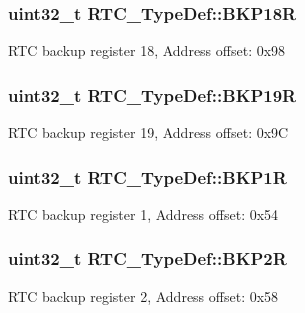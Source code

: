 \subsubsection[{\texorpdfstring{B\+K\+P18R}{BKP18R}}]{ uint32\+\_\+t R\+T\+C\+\_\+\+Type\+Def\+::\+B\+K\+P18R}\hypertarget{struct_r_t_c___type_def_a171288f82cab2623832de779fb435d74}{}\label{struct_r_t_c___type_def_a171288f82cab2623832de779fb435d74}
R\+TC backup register 18, Address offset\+: 0x98 
\subsubsection[{\texorpdfstring{B\+K\+P19R}{BKP19R}}]{ uint32\+\_\+t R\+T\+C\+\_\+\+Type\+Def\+::\+B\+K\+P19R}\hypertarget{struct_r_t_c___type_def_a993f54e8feff9254f795dfd3e000fc55}{}\label{struct_r_t_c___type_def_a993f54e8feff9254f795dfd3e000fc55}
R\+TC backup register 19, Address offset\+: 0x9C 
\subsubsection[{\texorpdfstring{B\+K\+P1R}{BKP1R}}]{ uint32\+\_\+t R\+T\+C\+\_\+\+Type\+Def\+::\+B\+K\+P1R}\hypertarget{struct_r_t_c___type_def_a5439bfca3708c6b8be6a74626f06111f}{}\label{struct_r_t_c___type_def_a5439bfca3708c6b8be6a74626f06111f}
R\+TC backup register 1, Address offset\+: 0x54 
\subsubsection[{\texorpdfstring{B\+K\+P2R}{BKP2R}}]{ uint32\+\_\+t R\+T\+C\+\_\+\+Type\+Def\+::\+B\+K\+P2R}\hypertarget{struct_r_t_c___type_def_aa845c401b24d2ef1049f489f26d35626}{}\label{struct_r_t_c___type_def_aa845c401b24d2ef1049f489f26d35626}
R\+TC backup register 2, Address offset\+: 0x58 
